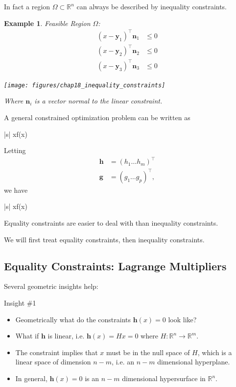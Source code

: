 \documentclass{article}
\newtheorem{example}[theorem]{Example}
\newcommand{\gbf}{\mathbf{g}}
\newcommand{\hbf}{\mathbf{h}}
\newcommand{\nbf}{\mathbf{n}}
\newcommand{\ybf}{\mathbf{y}}
\begin{document}
	In fact a region $\Omega \subset \mathbb{R}^n$ can always be described by inequality constraints.

		
	\begin{example}
				Feasible Region $\Omega$:
				\begin{align*}
					(x-\ybf_1)^\top \nbf_1 &\leq 0	\\
					(x-\ybf_2)^\top \nbf_2 &\leq 0	\\
					(x-\ybf_3)^\top \nbf_3 &\leq 0
				\end{align*}


				\begin{center}
					\texttt{[image: figures/chap18\_inequality\_constraints]}
				\end{center}

		Where $\nbf_i$ is a vector normal to the linear constraint.	
	\end{example}

	A general constrained optimization problem can be written as
	\begin{mini*}|s|
		{x\in\Omega}{f(x)}{}{}
		\addConstraint{\vdots}
		\addConstraint{\vdots}
	\end{mini*}

	Letting 
		\begin{align*}
			\hbf &= (h_1 \ldots h_m)^\top \\
			\gbf &= (g_1 \ldots g_p)^\top,		
		\end{align*}
 	we have
	\begin{mini*}|s|
		{x\in\Omega}{f(x)}{}{}
		\addConstraint{\hbf(x)=0}
		\addConstraint{\gbf(x)\leq 0}		
	\end{mini*} 	
	
	Equality constraints are easier to deal with than inequality constraints.
		
	We will first treat equality constraints, then inequality constraints.
	
\subsection{Equality Constraints: Lagrange Multipliers}

	Several geometric insights help:
	
	{\color{blue}Insight  \#1} 
	\begin{itemize}
		\item Geometrically what do the constraints $\hbf(x) = 0$ look like?
		\item What if $\hbf$ is linear, i.e. $\hbf(x) = Hx = 0$ where $H:\mathbb{R}^n\to\mathbb{R}^m$.
		\item The constraint implies that $x$ must be in the null space of $H$, which is a linear space of dimension $n-m$, i.e. an $n-m$ dimensional hyperplane.
		\item In general, $\hbf(x)=0$ is an $n-m$ dimensional hypersurface in $\mathbb{R}^n$.
	\end{itemize}
\end{document}
